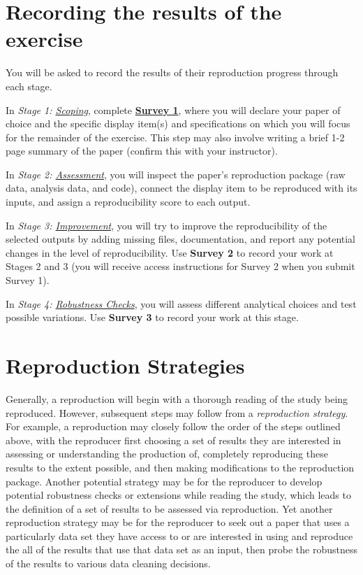 \documentclass[]{book}
\begin{document}
\hypertarget{recording-the-results-of-the-exercise}{%
\section*{Recording the results of the exercise}\label{recording-the-results-of-the-exercise}}

You will be asked to record the results of their reproduction progress through each stage.

In \emph{Stage 1: \protect\hyperlink{scoping}{Scoping}}, complete \textbf{\href{https://berkeley.qualtrics.com/jfe/form/SV_2bO83uJvU9ZiTXv}{Survey 1}}, where you will declare your paper of choice and the specific display item(s) and specifications on which you will focus for the remainder of the exercise. This step may also involve writing a brief 1-2 page summary of the paper (confirm this with your instructor).

In \emph{Stage 2: \protect\hyperlink{assessment}{Assessment}}, you will inspect the paper's reproduction package (raw data, analysis data, and code), connect the display item to be reproduced with its inputs, and assign a reproducibility score to each output.

In \emph{Stage 3: \protect\hyperlink{improvements}{Improvement}}, you will try to improve the reproducibility of the selected outputs by adding missing files, documentation, and report any potential changes in the level of reproducibility. Use \textbf{Survey 2} to record your work at Stages 2 and 3 (you will receive access instructions for Survey 2 when you submit Survey 1).

In \emph{Stage 4: \protect\hyperlink{robust}{Robustness Checks}}, you will assess different analytical choices and test possible variations. Use \textbf{Survey 3} to record your work at this stage.

\hypertarget{reproduction-strategies}{%
\section*{Reproduction Strategies}\label{reproduction-strategies}}

Generally, a reproduction will begin with a thorough reading of the study being reproduced. However, subsequent steps may follow from a \emph{reproduction strategy}. For example, a reproduction may closely follow the order of the steps outlined above, with the reproducer first choosing a set of results they are interested in assessing or understanding the production of, completely reproducing these results to the extent possible, and then making modifications to the reproduction package. Another potential strategy may be for the reproducer to develop potential robustness checks or extensions while reading the study, which leads to the definition of a set of results to be assessed via reproduction. Yet another reproduction strategy may be for the reproducer to seek out a paper that uses a particularly data set they have access to or are interested in using and reproduce the all of the results that use that data set as an input, then probe the robustness of the results to various data cleaning decisions.
\end{document}
